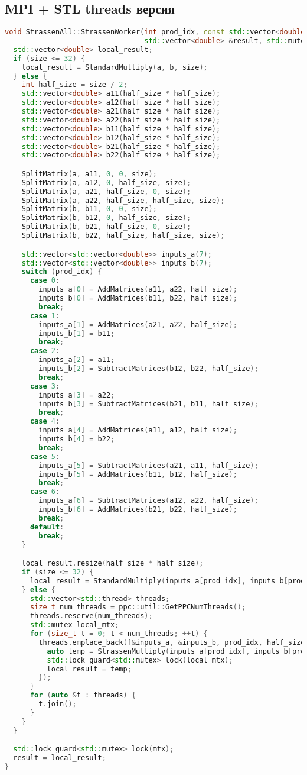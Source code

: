 \documentclass[14pt,a4paper]{extarticle}
\begin{document}
\subsection{MPI + STL threads версия}
\begin{lstlisting}[language=C++]
void StrassenAll::StrassenWorker(int prod_idx, const std::vector<double> &a, const std::vector<double> &b, int size,
                                 std::vector<double> &result, std::mutex &mtx) {
  std::vector<double> local_result;
  if (size <= 32) {
    local_result = StandardMultiply(a, b, size);
  } else {
    int half_size = size / 2;
    std::vector<double> a11(half_size * half_size);
    std::vector<double> a12(half_size * half_size);
    std::vector<double> a21(half_size * half_size);
    std::vector<double> a22(half_size * half_size);
    std::vector<double> b11(half_size * half_size);
    std::vector<double> b12(half_size * half_size);
    std::vector<double> b21(half_size * half_size);
    std::vector<double> b22(half_size * half_size);

    SplitMatrix(a, a11, 0, 0, size);
    SplitMatrix(a, a12, 0, half_size, size);
    SplitMatrix(a, a21, half_size, 0, size);
    SplitMatrix(a, a22, half_size, half_size, size);
    SplitMatrix(b, b11, 0, 0, size);
    SplitMatrix(b, b12, 0, half_size, size);
    SplitMatrix(b, b21, half_size, 0, size);
    SplitMatrix(b, b22, half_size, half_size, size);

    std::vector<std::vector<double>> inputs_a(7);
    std::vector<std::vector<double>> inputs_b(7);
    switch (prod_idx) {
      case 0:
        inputs_a[0] = AddMatrices(a11, a22, half_size);
        inputs_b[0] = AddMatrices(b11, b22, half_size);
        break;
      case 1:
        inputs_a[1] = AddMatrices(a21, a22, half_size);
        inputs_b[1] = b11;
        break;
      case 2:
        inputs_a[2] = a11;
        inputs_b[2] = SubtractMatrices(b12, b22, half_size);
        break;
      case 3:
        inputs_a[3] = a22;
        inputs_b[3] = SubtractMatrices(b21, b11, half_size);
        break;
      case 4:
        inputs_a[4] = AddMatrices(a11, a12, half_size);
        inputs_b[4] = b22;
        break;
      case 5:
        inputs_a[5] = SubtractMatrices(a21, a11, half_size);
        inputs_b[5] = AddMatrices(b11, b12, half_size);
        break;
      case 6:
        inputs_a[6] = SubtractMatrices(a12, a22, half_size);
        inputs_b[6] = AddMatrices(b21, b22, half_size);
        break;
      default:
        break;
    }

    local_result.resize(half_size * half_size);
    if (size <= 32) {
      local_result = StandardMultiply(inputs_a[prod_idx], inputs_b[prod_idx], half_size);
    } else {
      std::vector<std::thread> threads;
      size_t num_threads = ppc::util::GetPPCNumThreads();
      threads.reserve(num_threads);
      std::mutex local_mtx;
      for (size_t t = 0; t < num_threads; ++t) {
        threads.emplace_back([&inputs_a, &inputs_b, prod_idx, half_size, &local_result, &local_mtx]() {
          auto temp = StrassenMultiply(inputs_a[prod_idx], inputs_b[prod_idx], half_size);
          std::lock_guard<std::mutex> lock(local_mtx);
          local_result = temp;
        });
      }
      for (auto &t : threads) {
        t.join();
      }
    }
  }

  std::lock_guard<std::mutex> lock(mtx);
  result = local_result;
}
\end{lstlisting}
\end{document}
